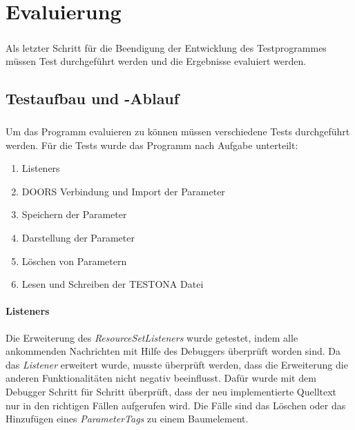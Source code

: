 \chapter{Evaluierung}\label{chp:Evaluierung}
\paragraph{}

Als letzter Schritt für die Beendigung der Entwicklung des Testprogrammes müssen Test durchgeführt werden und die Ergebnisse evaluiert werden.


\newpage
\section{Testaufbau und -Ablauf} \label{sec:test}
\paragraph{}
Um das Programm evaluieren zu können müssen verschiedene Tests durchgeführt werden. Für die Tests wurde das Programm nach Aufgabe unterteilt:

\begin{enumerate}
\item Listeners
\item DOORS Verbindung und Import der Parameter
\item Speichern der Parameter
\item Darstellung der Parameter
\item Löschen von Parametern
\item Lesen und Schreiben der TESTONA Datei
\end{enumerate}


\subsubsection{Listeners}
Die Erweiterung des \textit{ResourceSetListeners} wurde getestet, indem alle ankommenden Nachrichten mit Hilfe des Debuggers überprüft worden sind. Da das \textit{Listener} erweitert wurde, musste überprüft werden, dass die Erweiterung die anderen Funktionalitäten nicht negativ beeinflusst. Dafür wurde mit dem Debugger Schritt für Schritt überprüft, dass der neu implementierte Quelltext nur in den richtigen Fällen aufgerufen wird. Die Fälle sind das Löschen oder das Hinzufügen eines \textit{ParameterTags} zu einem Baumelement.\\



